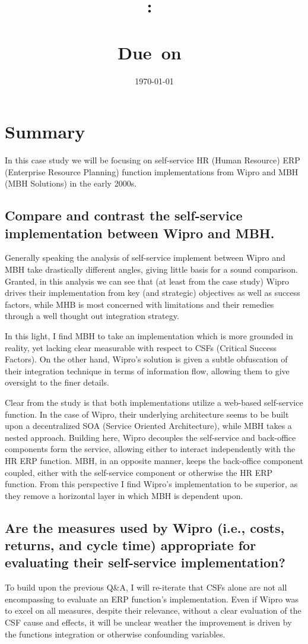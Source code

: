 \documentclass{article}
\title{
    \vspace{2in}
    \textmd{\textbf{\hmwkClass:\ \\ \hmwkTitle}}\\
    \normalsize\vspace{0.1in}\small{Due\ on\ \hmwkDueDate}\\
    \vspace{0.1in}\Large{\textit{\paprTitle}}
    \vspace{3in}
}
\author{\hmwkAuthorName}
\date{\today}
\begin{document}
\maketitle

\pagebreak

\tableofcontents
\newpage

\section{Summary}
In this case study we will be focusing on self-service HR (Human Resource) ERP (Enterprise Resource Planning) function implementations from Wipro and MBH (MBH Solutions) in the early 2000s.

\subsection{Compare and contrast the self-service implementation between Wipro and MBH.}
Generally speaking the analysis of self-service implement between Wipro and MBH take drastically different angles, giving little basis for a sound comparison.
Granted, in this analysis we can see that (at least from the case study) Wipro drives their implementation from key (and strategic) objectives as well as success factors, while MHB is most concerned with limitations and their remedies through a well thought out integration strategy.

In this light, I find MBH to take an implementation which is more grounded in reality, yet lacking clear measurable with respect to CSFs (Critical Success Factors).
On the other hand, Wipro's solution is given a subtle obfuscation of their integration technique in terms of information flow, allowing them to give oversight to the finer details.

Clear from the study is that both implementations utilize a web-based self-service function.
In the case of Wipro, their underlying architecture seems to be built upon a decentralized SOA (Service Oriented Architecture), while MBH takes a nested approach.
Building here, Wipro decouples the self-service and back-office components form the service, allowing either to interact independently with the HR ERP function.
MBH, in an opposite manner, keeps the back-office component coupled, either with the self-service component or otherwise the HR ERP function.
From this perspective I find Wipro's implementation to be superior, as they remove a horizontal layer in which MBH is dependent upon.

\subsection{Are the measures used by Wipro (i.e., costs, returns, and cycle time) appropriate for evaluating their self-service implementation?}
To build upon the previous Q\&A, I will re-iterate that CSFs alone are not all encompassing to evaluate an ERP function's implementation.
Even if Wipro was to excel on all measures, despite their relevance, without a clear evaluation of the CSF cause and effects, it will be unclear weather the improvement is driven by the functions integration or otherwise confounding variables.
\end{document}

